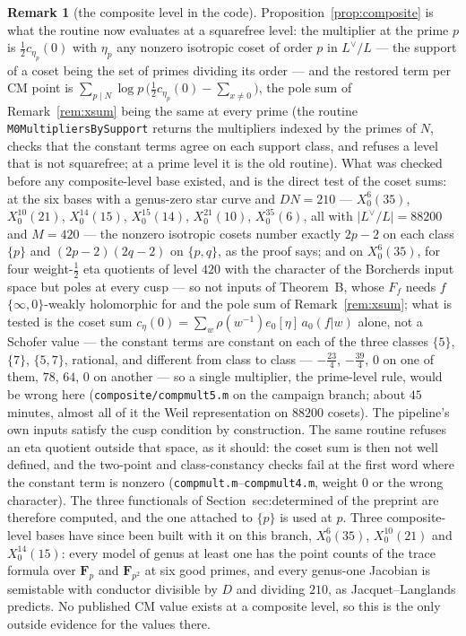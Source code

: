 \documentclass[11pt,reqno]{amsart}
\theoremstyle{plain}
\theoremstyle{definition}
\newtheorem{remark}[theorem]{Remark}
\newcommand{\Ldual}{L^{\vee}}
\begin{document}
\begin{remark}[the composite level in the code]\label{rem:compimpl}
Proposition~\ref{prop:composite} is what the routine now evaluates at a squarefree level: the
multiplier at the prime $p$ is $\tfrac12c_{\eta_p}(0)$ with $\eta_p$ any nonzero isotropic coset of
order $p$ in $\Ldual/L$ --- the support of a coset being the set of primes dividing its order ---
and the restored term per CM point is $\sum_{p\mid N}\log p\,\bigl(\tfrac12c_{\eta_p}(0)-\sum_{x\ne0}
\bigr)$, the pole sum of Remark~\ref{rem:xsum} being the same at every prime (the routine
\texttt{M0MultipliersBySupport} returns the multipliers indexed by the primes of $N$, checks that
the constant terms agree on each support class, and refuses a level that is not squarefree; at a
prime level it is the old routine). What was checked before any composite-level base existed, and
is the direct test of the coset sums: at the six bases with a genus-zero star curve and $DN=210$ --- $X_0^6(35)$, $X_0^{10}(21)$,
$X_0^{14}(15)$, $X_0^{15}(14)$, $X_0^{21}(10)$, $X_0^{35}(6)$, all with $\lvert\Ldual/L\rvert=88200$
and $M=420$ --- the nonzero isotropic cosets number exactly $2p-2$ on each class $\{p\}$ and
$(2p-2)(2q-2)$ on $\{p,q\}$, as the proof says; and on $X_0^6(35)$, for four weight-$\tfrac12$ eta quotients of
level $420$ with the character of the Borcherds input space but poles at every cusp --- so not inputs
of Theorem~B, whose $F_f$ needs $f$ $\{\infty,0\}$-weakly holomorphic for \cite[Lemma~24]{GY} and
the pole sum of Remark~\ref{rem:xsum}; what is tested is the coset sum $c_\eta(0)=\sum_w\rho(w^{-1})
e_0[\eta]\,a_0(f|w)$ alone, not a Schofer value --- the constant terms are constant on each of the
three classes $\{5\}$, $\{7\}$, $\{5,7\}$, rational, and different from class to class ---
$-\tfrac{23}4$, $-\tfrac{39}4$, $0$ on one of them, $78$, $64$, $0$ on another --- so a single
multiplier, the prime-level rule, would be wrong here (\texttt{composite/compmult5.m} on the campaign
branch; about $45$ minutes, almost all of it the Weil representation on $88200$ cosets). The
pipeline's own inputs satisfy the cusp condition by construction. The same routine refuses an eta quotient outside that space,
as it should: the coset sum is then not well defined, and the two-point and class-constancy checks
fail at the first word where the constant term is nonzero (\texttt{compmult.m}--\texttt{compmult4.m},
weight $0$ or the wrong character). The three functionals of \textup{Section~sec:determined of the preprint}
are therefore computed, and the one attached to $\{p\}$ is used at $p$. Three composite-level bases
have since been built with it on this branch, $X_0^6(35)$, $X_0^{10}(21)$ and $X_0^{14}(15)$: every
model of genus at least one has the point counts of the trace formula over $\mathbf F_p$ and
$\mathbf F_{p^2}$ at six good primes, and every genus-one Jacobian is semistable with conductor
divisible by $D$ and dividing $210$, as Jacquet--Langlands predicts. No published CM value exists at
a composite level, so this is the only outside evidence for the values there.
\end{remark}
\end{document}
